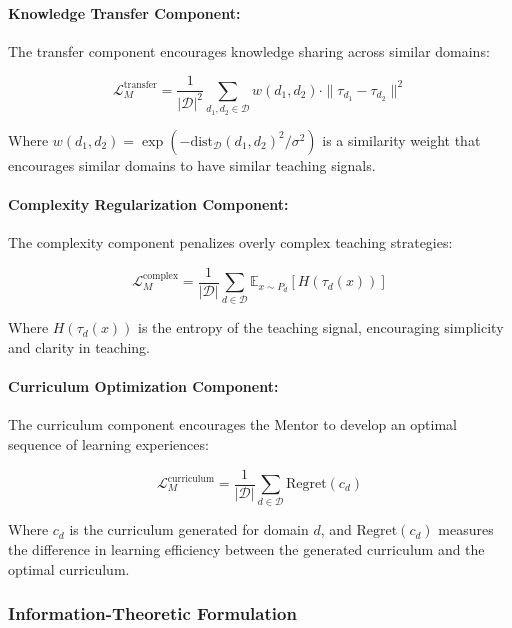 \paragraph{Knowledge Transfer Component:}
The transfer component encourages knowledge sharing across similar domains:

\begin{equation}
\mathcal{L}_M^{\text{transfer}} = \frac{1}{|\mathcal{D}|^2} \sum_{d_1, d_2 \in \mathcal{D}} w(d_1, d_2) \cdot \|\tau_{d_1} - \tau_{d_2}\|^2
\end{equation}

Where $w(d_1, d_2) = \exp(-\text{dist}_{\mathcal{D}}(d_1, d_2)^2 / \sigma^2)$ is a similarity weight that encourages similar domains to have similar teaching signals.

\paragraph{Complexity Regularization Component:}
The complexity component penalizes overly complex teaching strategies:

\begin{equation}
\mathcal{L}_M^{\text{complex}} = \frac{1}{|\mathcal{D}|} \sum_{d \in \mathcal{D}} \mathbb{E}_{x \sim P_d} [H(\tau_d(x))]
\end{equation}

Where $H(\tau_d(x))$ is the entropy of the teaching signal, encouraging simplicity and clarity in teaching.

\paragraph{Curriculum Optimization Component:}
The curriculum component encourages the Mentor to develop an optimal sequence of learning experiences:

\begin{equation}
\mathcal{L}_M^{\text{curriculum}} = \frac{1}{|\mathcal{D}|} \sum_{d \in \mathcal{D}} \text{Regret}(c_d)
\end{equation}

Where $c_d$ is the curriculum generated for domain $d$, and $\text{Regret}(c_d)$ measures the difference in learning efficiency between the generated curriculum and the optimal curriculum.

\subsubsection{Information-Theoretic Formulation}

